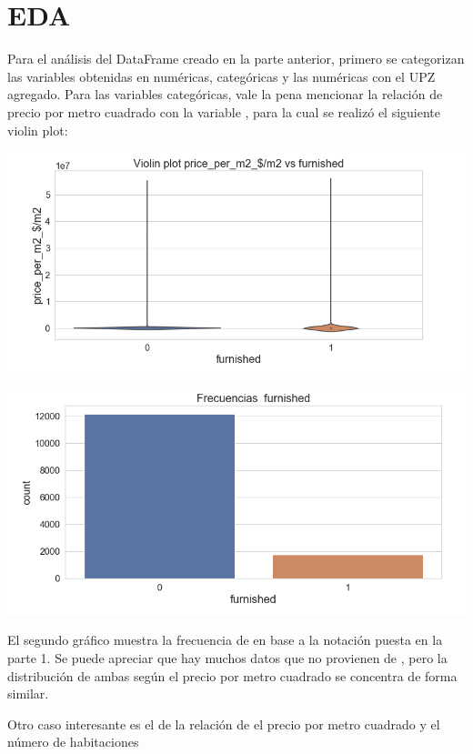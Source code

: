 \section{EDA}

Para el análisis del DataFrame creado en la parte anterior, primero se categorizan las variables obtenidas en numéricas, categóricas y las numéricas con el UPZ agregado. Para las variables categóricas, vale la pena mencionar la relación de precio por metro cuadrado con la variable , para la cual se realizó el siguiente violin plot:

\begin{multicols}{2}
\includegraphics[scale = 0.4]{img/ejemplos/P2-2-1.png}

\includegraphics[scale = 0.4]{img/ejemplos/P2-2-2.png}
\end{multicols}

El segundo gráfico muestra la frecuencia de  en base a la notación puesta en la parte 1. Se puede apreciar que hay muchos datos que no provienen de , pero la distribución de ambas según el precio por metro cuadrado se concentra de forma similar.

Otro caso interesante es el de la relación de el precio por metro cuadrado y el número de habitaciones

